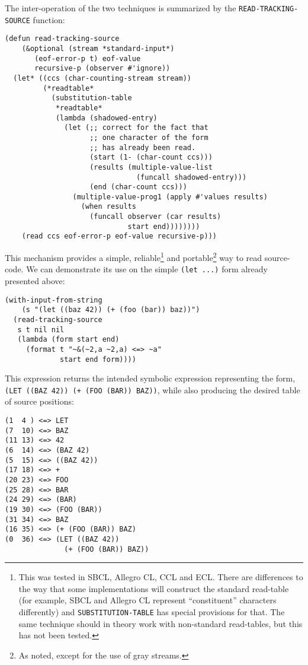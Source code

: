 \documentclass[sigconf]{acmart}
\begin{document}
The inter-operation of the two techniques is summarized by the
\texttt{READ-TRACKING-SOURCE} function:

\begin{verbatim}
(defun read-tracking-source
    (&optional (stream *standard-input*)
       (eof-error-p t) eof-value
       recursive-p (observer #'ignore))
  (let* ((ccs (char-counting-stream stream))
         (*readtable*
           (substitution-table
            *readtable*
            (lambda (shadowed-entry)
              (let (;; correct for the fact that
                    ;; one character of the form
                    ;; has already been read.
                    (start (1- (char-count ccs)))
                    (results (multiple-value-list
                               (funcall shadowed-entry)))
                    (end (char-count ccs)))
                (multiple-value-prog1 (apply #'values results)
                  (when results
                    (funcall observer (car results)
                             start end))))))))
    (read ccs eof-error-p eof-value recursive-p)))
\end{verbatim}

This mechanism provides a simple, reliable\footnote{This was tested in
  SBCL, Allegro CL, CCL and ECL.  There are differences to the way
  that some implementations will construct the standard read-table
  (for example, SBCL and Allegro CL represent ``constituent''
  characters differently) and \texttt{SUBSTITUTION-TABLE} has special
  provisions for that.  The same technique should in theory work with
  non-standard read-tables, but this has not been tested.} and
portable\footnote{As noted, except for the use of gray streams.}  way
to read source-code.  We can demonstrate its use on the simple
\texttt{(let ...)} form already presented above:

\begin{verbatim}
(with-input-from-string
    (s "(let ((baz 42)) (+ (foo (bar)) baz))")
  (read-tracking-source
   s t nil nil
   (lambda (form start end)
     (format t "~&(~2,a ~2,a) <=> ~a"
             start end form))))
\end{verbatim}

This expression returns the intended symbolic expression representing
the form, \texttt{(LET ((BAZ 42)) (+ (FOO (BAR)) BAZ))}, while also
producing the desired table of source positions:

\begin{verbatim}
(1  4 ) <=> LET
(7  10) <=> BAZ
(11 13) <=> 42
(6  14) <=> (BAZ 42)
(5  15) <=> ((BAZ 42))
(17 18) <=> +
(20 23) <=> FOO
(25 28) <=> BAR
(24 29) <=> (BAR)
(19 30) <=> (FOO (BAR))
(31 34) <=> BAZ
(16 35) <=> (+ (FOO (BAR)) BAZ)
(0  36) <=> (LET ((BAZ 42))
              (+ (FOO (BAR)) BAZ))
\end{verbatim}
\end{document}
